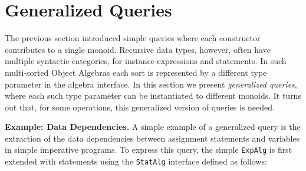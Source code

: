 \section{Generalized Queries}\label{sec:generalizedQueries}

The previous section introduced simple queries where each constructor
contributes to a single monoid.  Recursive data types, however, often
have multiple syntactic categories, for instance expressions and
statements.  In such multi-sorted Object Algebras each sort is
represented by a different type parameter in the algebra interface.
In this section we present \textit{generalized queries}, where each
such type parameter can be instantiated to different monoids.
It turns out that, for some operations, this generalized version
of queries is needed.\\

\begin{comment}
\haoyuan{General template. Some redundant texts.}
Figure~\ref{gQueryTemplate} shows the general template for \lstinline{Alg<X1, X2, ..., Xn>}.
Note that interface \lstinline{Alg}$_{GQ}$ extends \lstinline{Alg} and declares one monoid for each sort. As we cannot directly join a monoid over one type with a monoid over another type, for every constructor in \lstinline{Alg}$_{GQ}$, the arguments with different types from its return type are ignored.

\begin{figure}[t]
\begin{lstlisting}[mathescape=true]
interface Alg$_{GQ}$<X$_1$,$...$,X$_n$> extends Alg<X$_1$,$...$,X$_n$> {
  Monoid<X$_1$> m$_1$(); $...$; Monoid<X$_n$> m$_n$();

  default X$_i$ f$_j$(X$^1_p$ p$_1$, $...$, X$^k_p$ p$_k$) {
    X$_i$ res = m$_i$().empty();

    /* For all $s$ such that X$^s_p$ = X$_i$. */
    res = m$_i$().join(res, p$_s$);
    $...$
  }
  $...$
}
\end{lstlisting}
\caption{Generic template for generating boilerplate of generalized queries}
\label{gQueryTemplate}
\end{figure}
\end{comment}


\noindent\textbf{Example: Data Dependencies.} A simple example of a generalized query is the extraction of the data
dependencies between assignment statements and variables in simple
imperative programs.  To express this query, the simple
\lstinline{ExpAlg} is first extended with statements using the
\lstinline{StatAlg} interface defined as follows:\\

